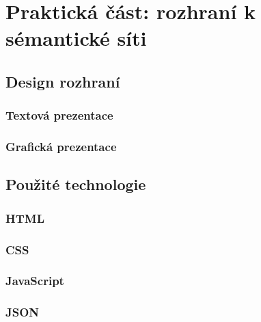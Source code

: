 \documentclass[a4paper, 11pt, oneside]{book}
\begin{document}
	\part{Praktická část: rozhraní k sémantické síti}

		\chapter{Design rozhraní}

			\section{Textová prezentace}


			\section{Grafická prezentace}


		\chapter{Použité technologie}

			\section{HTML}

			\section{CSS}

			\section{JavaScript}

			\section{JSON}


 
	\printbibliography[]

\end{document}
